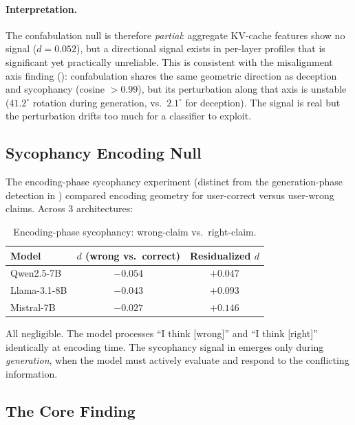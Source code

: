 \paragraph{Interpretation.} The confabulation null is therefore \emph{partial}: aggregate KV-cache features show no signal ($d = 0.052$), but a directional signal exists in per-layer profiles that is significant yet practically unreliable. This is consistent with the misalignment axis finding (): confabulation shares the same geometric direction as deception and sycophancy (cosine $> 0.99$), but its perturbation along that axis is unstable ($41.2^{\circ}$ rotation during generation, vs.\ $2.1^{\circ}$ for deception). The signal is real but the perturbation drifts too much for a classifier to exploit.

\subsection{Sycophancy Encoding Null}
\label{sec:syc_null}

The encoding-phase sycophancy experiment (distinct from the generation-phase detection in ) compared encoding geometry for user-correct versus user-wrong claims. Across 3 architectures:

\begin{table}[H]
\centering
\caption{Encoding-phase sycophancy: wrong-claim vs.\ right-claim.}
\label{tab:syc_encoding}
\begin{tabular}{lcc}
\toprule
\textbf{Model} & \textbf{$d$ (wrong vs.\ correct)} & \textbf{Residualized $d$} \\
\midrule
Qwen2.5-7B & $-0.054$ & $+0.047$ \\
Llama-3.1-8B & $-0.043$ & $+0.093$ \\
Mistral-7B & $-0.027$ & $+0.146$ \\
\bottomrule
\end{tabular}
\end{table}

All negligible. The model processes ``I think [wrong]'' and ``I think [right]'' identically at encoding time. The sycophancy signal in  emerges only during \emph{generation}, when the model must actively evaluate and respond to the conflicting information.

\subsection{The Core Finding}

